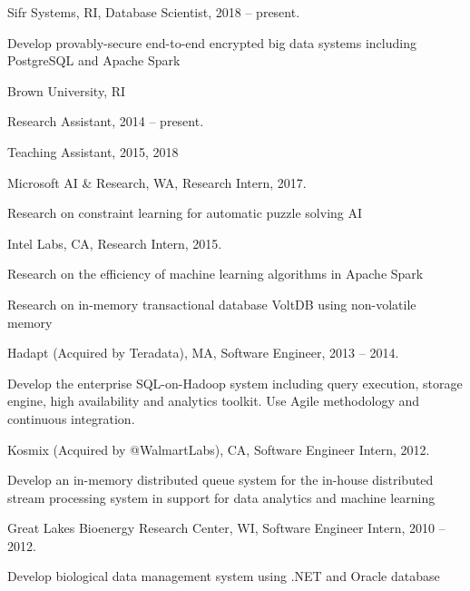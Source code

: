 \documentclass[letterpaper]{article}
\renewenvironment{itemize}{
  \begin{list}{}{
    \setlength{\leftmargin}{1.5em}
  }
}{
  \end{list}
}
\begin{document}
\begin{itemize}
\item Sifr Systems, RI, Database Scientist, 2018 -- present.
	\begin{itemize}
		\item Develop provably-secure end-to-end encrypted big data systems including PostgreSQL and 
		Apache Spark
	\end{itemize}
\item Brown University, RI
	\begin{itemize}
		\item Research Assistant, 2014 -- present.
		\item Teaching Assistant, 2015, 2018
	\end{itemize}
\item Microsoft AI \& Research, WA, Research Intern, 2017.
	\begin{itemize}
		\item Research on constraint learning for automatic puzzle solving AI
	\end{itemize}
\item Intel Labs, CA, Research Intern, 2015.
	\begin{itemize}
		\item Research on the efficiency of machine learning algorithms in Apache Spark
		\item Research on in-memory transactional database VoltDB using non-volatile memory
	\end{itemize}
\item Hadapt (Acquired by Teradata), MA, Software Engineer, 2013 -- 2014.
	\begin{itemize}
		\item Develop the enterprise SQL-on-Hadoop system including query execution, storage engine, high availability and analytics toolkit.  Use Agile methodology and continuous integration.
	\end{itemize}
\item Kosmix (Acquired by @WalmartLabs), CA, Software Engineer Intern, 2012.
	\begin{itemize}
		\item Develop an in-memory distributed queue system for the in-house distributed stream processing system in support for data analytics and machine learning
	\end{itemize}
\item Great Lakes Bioenergy Research Center, WI, Software Engineer Intern, 2010 -- 2012.
	\begin{itemize}
		\item Develop biological data management system using .NET and Oracle database
	\end{itemize}
\end{itemize}
\end{document}
